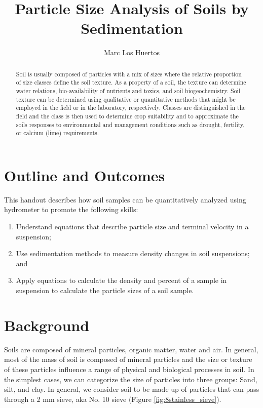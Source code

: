 \documentclass{tufte-handout}
\title{Particle Size Analysis of Soils by Sedimentation %
}
\author[Marc Los Huertos]{Marc Los Huertos}
\begin{document}


\maketitle%
\begin{abstract}
\noindent Soil is usually composed of particles with a mix of sizes where the relative proportion of size classes define the soil texture. As a property of a soil, the texture can determine water relations, bio-availability of nutrients and toxics, and soil biogeochemistry. Soil texture can be determined using qualitative or quantitative methods that might be employed in the field or in the laboratory, respectively. Classes are distinguished in the field and the class is then used to determine crop suitability and to approximate the soils responses to environmental and management conditions such as drought, fertility, or calcium (lime) requirements.
\end{abstract}



\section{Outline and Outcomes}
This handout describes how soil samples can be quantitatively analyzed using hydrometer to promote the following skills:

\begin{enumerate}
	\item Understand equations that describe particle size and terminal velocity in a suspension;
	\item Use sedimentation methods to measure density changes in soil suspensions; and
	\item Apply equations to calculate the density and percent of a sample in suspension to calculate the particle sizes of a soil sample. 
\end{enumerate}

\section{Background}

Soils are composed of mineral particles, organic matter, water and air. In general, most of the mass of soil is composed of mineral particles and the size or texture of these particles influence a range of physical and biological processes in soil. In the simplest cases, we can categorize the size of particles into three groups: Sand, silt, and clay. In general, we consider soil to be made up of particles that can pass through a 2 mm sieve, aka No. 10 sieve (Figure \ref{fig:8stainless_sieve}). 
\end{document}
